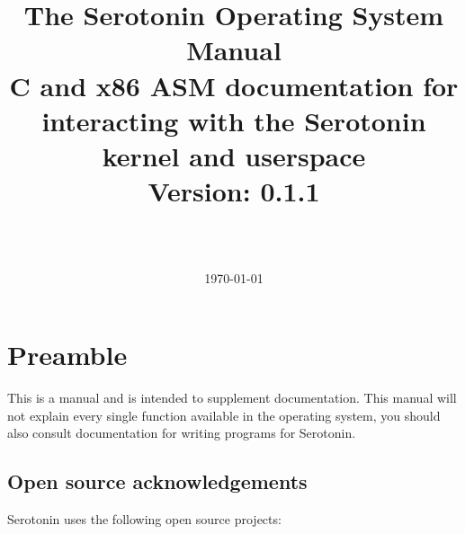 \documentclass[11pt,a4paper]{article}
\title{
	\textbf{\Huge The Serotonin Operating System Manual} \\
	\large{C and x86 ASM documentation for interacting with the Serotonin kernel and userspace} \\
	\vspace{0.5cm}
	\vspace{0.3cm}
	Version: 0.1.1 \\
	\vspace{0.5cm}
	\textit{} \\
	\date{\today}
}
\author{}
\begin{document}
	\maketitle
	\tableofcontents
	\newpage

	\section{Preamble}
	This is a manual and is intended to supplement documentation. This manual will not explain every single function available in the operating system, you should also consult documentation for writing programs for Serotonin.

	\subsection{Open source acknowledgements}
	Serotonin uses the following open source projects:
\end{document}
